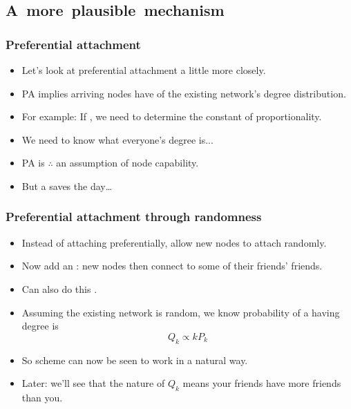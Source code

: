 \subsection{A\ more\ plausible\ mechanism}

\begin{frame}[label=]
 \frametitle{Preferential attachment}  

 \begin{block}{}
 \begin{itemize}
 \item<1-> 
   Let's look at preferential attachment 
   a little more closely.
 \item<2-> 
   PA implies arriving nodes have 
   of the existing network's degree distribution.
 \item<3->
   For example: If , we need to determine
   the constant of proportionality.
 \item<4->
   We need to know what everyone's degree is...
 \item<5->
   PA is $\therefore$ an  assumption of
   node capability.
 \item<6->
   But a  saves the day\ldots
 \end{itemize}
 \end{block}

\end{frame}

\begin{frame}[label=]
 \frametitle{Preferential attachment through randomness}  

 \begin{block}{}
 \begin{itemize}
 \item<1-> Instead of attaching preferentially, allow
   new nodes to attach randomly.
 \item<2-> Now add an : new nodes
   then connect to some of their friends' friends.
 \item<3-> Can also do this .
 \item<4-> Assuming the existing network is random,
   we know probability of a  having
   degree  is 
   $$Q_k \propto kP_k$$
 \item<5-> 
   So  scheme can
   now be seen to work in a natural way.
 \item<6-> 
   Later: we'll see that the nature of $Q_{k}$
   means your friends have more friends than you.
 \end{itemize}
 \end{block}

\end{frame}


